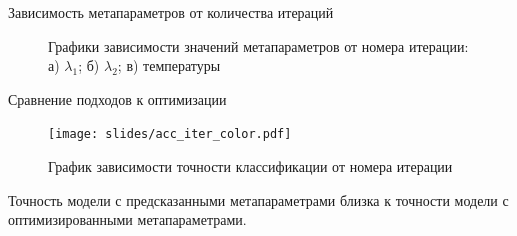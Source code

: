 \documentclass[10pt, aspectratio=169]{beamer}
\begin{document}
\begin{frame}{Зависимость метапараметров от количества итераций}
\fontsize{6}{5}\selectfont
\begin{figure}
    \caption*{\fontsize{10}{12}\selectfont
    Графики зависимости значений метапараметров от номера итерации: а) $\lambda_1$; б) $\lambda_2$; в) температуры}
    \vspace{-0.3 cm}
    \begin{minipage}[h]{0.325\linewidth}
    \end{minipage}
    \begin{minipage}[h]{0.325\linewidth}
    \end{minipage}
    \vspace{-0.2 cm}
    \begin{minipage}[h]{0.325\linewidth}
    \end{minipage}
    
\end{figure}

\end{frame}

\begin{frame}{Сравнение подходов к оптимизации}
\begin{figure}
    \caption*{График зависимости точности классификации от номера итерации}
    \texttt{[image: slides/acc\_iter\_color.pdf]}
\end{figure}
Точность модели с предсказанными метапараметрами близка к точности модели с оптимизированными метапараметрами.
\end{frame}
\end{document}
